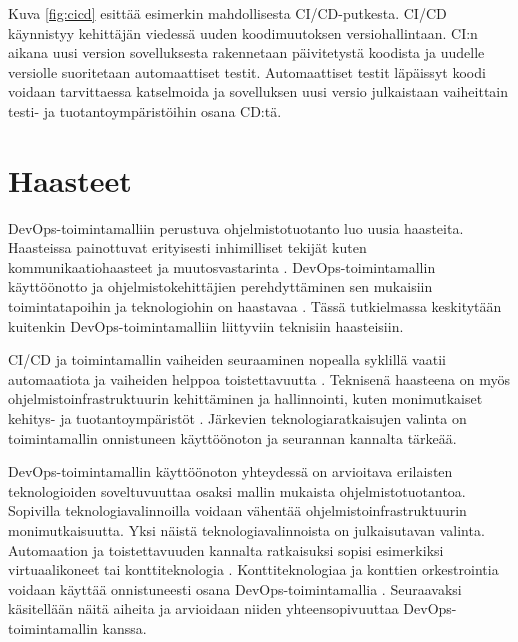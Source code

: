Kuva \ref{fig:cicd} esittää esimerkin mahdollisesta CI/CD-putkesta. CI/CD käynnistyy kehittäjän viedessä uuden koodimuutoksen versiohallintaan.
CI:n aikana uusi version sovelluksesta rakennetaan päivitetystä koodista ja uudelle versiolle suoritetaan automaattiset testit.
Automaattiset testit läpäissyt koodi voidaan tarvittaessa katselmoida ja sovelluksen uusi versio julkaistaan vaiheittain testi- ja tuotantoympäristöihin osana CD:tä.

\section{Haasteet}

DevOps-toimintamalliin perustuva ohjelmistotuotanto luo uusia haasteita.
Haasteissa painottuvat erityisesti inhimilliset tekijät kuten kommunikaatiohaasteet ja muutosvastarinta \cite{Kalliosaari16}.
DevOps-toimintamallin käyttöönotto ja ohjelmistokehittäjien perehdyttäminen sen mukaisiin toimintatapoihin ja teknologiohin on haastavaa \cite{Leite19}.
Tässä tutkielmassa keskitytään kuitenkin DevOps-toimintamalliin liittyviin teknisiin haasteisiin.

CI/CD ja toimintamallin vaiheiden seuraaminen nopealla syklillä vaatii automaatiota ja vaiheiden helppoa toistettavuutta \cite{Jabbari16, Leite19}.
Teknisenä haasteena on myös ohjelmistoinfrastruktuurin kehittäminen ja hallinnointi, kuten monimutkaiset kehitys- ja tuotantoympäristöt \cite{Khan22, Kalliosaari16}.
Järkevien teknologiaratkaisujen valinta on toimintamallin onnistuneen käyttöönoton ja seurannan kannalta tärkeää.

DevOps-toimintamallin käyttöönoton yhteydessä on arvioitava erilaisten teknologioiden soveltuvuuttaa osaksi mallin mukaista ohjelmistotuotantoa.
Sopivilla teknologiavalinnoilla voidaan vähentää ohjelmistoinfrastruktuurin monimutkaisuutta.
Yksi näistä teknologiavalinnoista on julkaisutavan valinta.
Automaation ja toistettavuuden kannalta ratkaisuksi sopisi esimerkiksi virtuaalikoneet tai konttiteknologia \cite{Dua14}.
Konttiteknologiaa ja konttien orkestrointia voidaan käyttää onnistuneesti osana DevOps-toimintamallia \cite{Kang16, Narasimhulu23}.
Seuraavaksi käsitellään näitä aiheita ja arvioidaan niiden yhteensopivuuttaa DevOps-toimintamallin kanssa.
